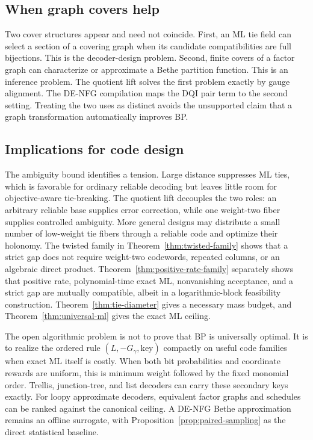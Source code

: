 \documentclass[journal]{IEEEtran}
\theoremstyle{definition}
\theoremstyle{remark}
\begin{document}
\subsection{When graph covers help}

Two cover structures appear and need not coincide.  First, an ML tie field can
select a section of a covering graph when its candidate compatibilities are
full bijections.  This is the decoder-design problem.  Second, finite covers
of a factor graph can characterize or approximate a Bethe partition function.
This is an inference problem.  The quotient lift solves the first problem
exactly by gauge alignment.  The DE-NFG compilation maps the DQI pair term to
the second setting.  Treating the two uses as distinct avoids the unsupported
claim that a graph transformation automatically improves BP.

\subsection{Implications for code design}

The ambiguity bound identifies a tension.  Large distance suppresses ML ties,
which is favorable for ordinary reliable decoding but leaves little room for
objective-aware tie-breaking.  The quotient lift decouples the two roles: an
arbitrary reliable base supplies error correction, while one weight-two fiber
supplies controlled ambiguity.  More general designs may distribute a small
number of low-weight tie fibers through a reliable code and optimize their
holonomy.  The twisted family in Theorem~\ref{thm:twisted-family} shows that a
strict gap does not require weight-two codewords, repeated columns, or an
algebraic direct product.  Theorem~\ref{thm:positive-rate-family} separately
shows that positive rate, polynomial-time exact ML, nonvanishing acceptance,
and a strict gap are mutually compatible, albeit in a logarithmic-block
feasibility construction.  Theorem~\ref{thm:tie-diameter} gives a necessary
mass budget, and Theorem~\ref{thm:universal-ml} gives the exact ML ceiling.

The open algorithmic problem is not to prove that BP is universally optimal.
It is to realize the ordered rule $(L,-G_\gamma,\text{key})$ compactly on useful
code families when exact ML itself is costly.  When both bit probabilities and
coordinate rewards are uniform, this is minimum weight followed by the fixed
monomial order.  Trellis,
junction-tree, and list decoders can carry these secondary keys exactly.  For
loopy approximate decoders, equivalent factor graphs and schedules can be
ranked against the canonical ceiling.  A DE-NFG Bethe approximation remains
an offline surrogate, with Proposition~\ref{prop:paired-sampling} as the
direct statistical baseline.
\end{document}
